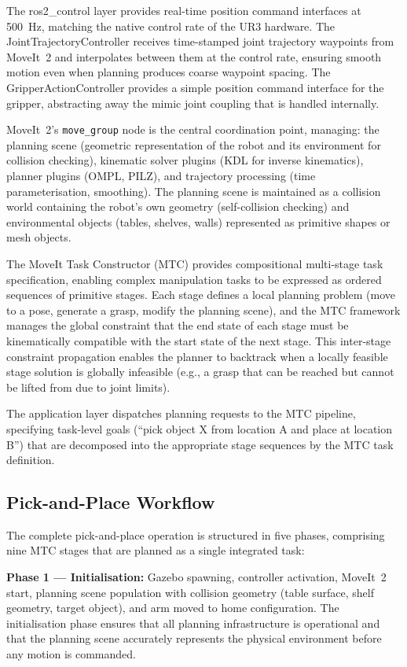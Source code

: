 \documentclass[12pt,a4paper,oneside]{report}
\begin{document}
The ros2\_control layer provides real-time position command interfaces at 500~Hz, matching the native control rate of the UR3 hardware. The JointTrajectoryController receives time-stamped joint trajectory waypoints from MoveIt~2 and interpolates between them at the control rate, ensuring smooth motion even when planning produces coarse waypoint spacing. The GripperActionController provides a simple position command interface for the gripper, abstracting away the mimic joint coupling that is handled internally.

MoveIt~2's \texttt{move\_group} node is the central coordination point, managing: the planning scene (geometric representation of the robot and its environment for collision checking), kinematic solver plugins (KDL for inverse kinematics), planner plugins (OMPL, PILZ), and trajectory processing (time parameterisation, smoothing). The planning scene is maintained as a collision world containing the robot's own geometry (self-collision checking) and environmental objects (tables, shelves, walls) represented as primitive shapes or mesh objects.

The MoveIt Task Constructor (MTC) provides compositional multi-stage task specification, enabling complex manipulation tasks to be expressed as ordered sequences of primitive stages. Each stage defines a local planning problem (move to a pose, generate a grasp, modify the planning scene), and the MTC framework manages the global constraint that the end state of each stage must be kinematically compatible with the start state of the next stage. This inter-stage constraint propagation enables the planner to backtrack when a locally feasible stage solution is globally infeasible (e.g., a grasp that can be reached but cannot be lifted from due to joint limits).

The application layer dispatches planning requests to the MTC pipeline, specifying task-level goals (``pick object X from location A and place at location B'') that are decomposed into the appropriate stage sequences by the MTC task definition.

\subsection{Pick-and-Place Workflow}

The complete pick-and-place operation is structured in five phases, comprising nine MTC stages that are planned as a single integrated task:

\textbf{Phase 1 --- Initialisation:} Gazebo spawning, controller activation, MoveIt~2 start, planning scene population with collision geometry (table surface, shelf geometry, target object), and arm moved to home configuration. The initialisation phase ensures that all planning infrastructure is operational and that the planning scene accurately represents the physical environment before any motion is commanded.
\end{document}
